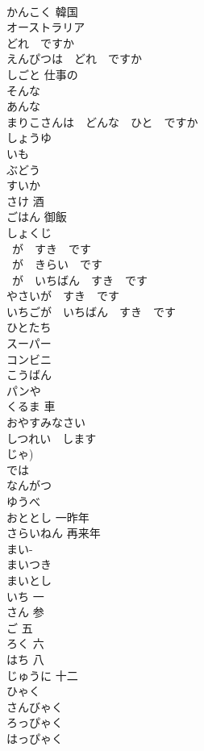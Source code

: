 \documentclass[8pt]{extreport}
\begin{document}
\begin{CJK}{UTF8}{min}
\\	かんこく	韓国
\\	オーストラリア	
\\	どれ　ですか	
\\	えんぴつは　どれ　ですか	
\\	しごと	仕事の
\\	そんな	
\\	あんな	
\\	まりこさんは　どんな　ひと　ですか	
\\	しょうゆ	
\\	いも	
\\	ぶどう	
\\	すいか	
\\	さけ	酒
\\	ごはん	御飯
\\	しょくじ	
\\	~が　すき　です	
\\	~が　きらい　です	
\\	~が　いちばん　すき　です	
\\	やさいが　すき　です	
\\	いちごが　いちばん　すき　です	
\\	ひとたち	
\\	スーパー	
\\	コンビニ	
\\	こうばん	
\\	パンや	
\\	くるま	車
\\	おやすみなさい	
\\	しつれい　します	
\\	じゃ) 
\\	では	
\\	なんがつ	
\\	ゆうべ	
\\	おととし	一昨年
\\	さらいねん	再来年
\\	まい- 
\\	まいつき	
\\	まいとし	
\\	いち	一
\\	さん	参
\\	ご	五
\\	ろく	六
\\	はち	八
\\	じゅうに	十二
\\	ひゃく	
\\	さんびゃく	
\\	ろっぴゃく	
\\	はっぴゃく	

\end{CJK}
\end{document}
